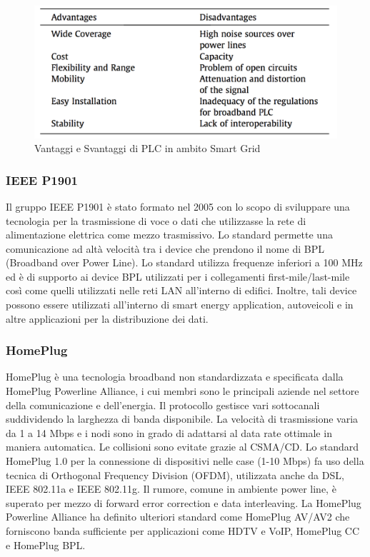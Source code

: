 \begin{figure}[h]
	\centering
	\includegraphics[scale=0.500]{imgs/vs_plc.png}
	\caption{Vantaggi e Svantaggi di PLC in ambito Smart Grid} \label{fig:vs_plc}
\end{figure}
\newpage
\subsubsection{IEEE P1901}
Il gruppo IEEE P1901 è stato formato nel 2005 con lo scopo di sviluppare una tecnologia per la trasmissione di voce o dati che utilizzasse la rete di alimentazione elettrica come mezzo trasmissivo. Lo standard permette una comunicazione ad altà velocità tra i device che prendono il nome di BPL (Broadband over Power Line). Lo standard utilizza frequenze inferiori a 100 MHz ed è di supporto ai device BPL utilizzati per i collegamenti first-mile/last-mile così come quelli utilizzati nelle reti LAN all'interno di edifici. Inoltre, tali device possono essere utilizzati all'interno di smart energy application, autoveicoli e in altre applicazioni per la distribuzione dei dati.
\subsubsection{HomePlug}
HomePlug è una tecnologia broadband non standardizzata e specificata dalla HomePlug Powerline Alliance, i cui membri sono le principali aziende nel settore della comunicazione e dell'energia. Il protocollo gestisce vari sottocanali suddividendo la larghezza di banda disponibile. La velocità di trasmissione varia da 1 a 14 Mbps e i nodi sono in grado di adattarsi al data rate ottimale in maniera automatica. Le collisioni sono evitate grazie al CSMA/CD. Lo standard HomePlug 1.0 per la connessione di dispositivi nelle case (1-10 Mbps) fa uso della tecnica di Orthogonal Frequency Division (OFDM), utilizzata anche da DSL, IEEE 802.11a e IEEE 802.11g. Il rumore, comune in ambiente power line, è superato per mezzo di forward error correction e data interleaving. La HomePlug Powerline Alliance ha definito ulteriori standard come HomePlug AV/AV2 che forniscono banda sufficiente per applicazioni come HDTV e VoIP, HomePlug CC e HomePlug BPL.
